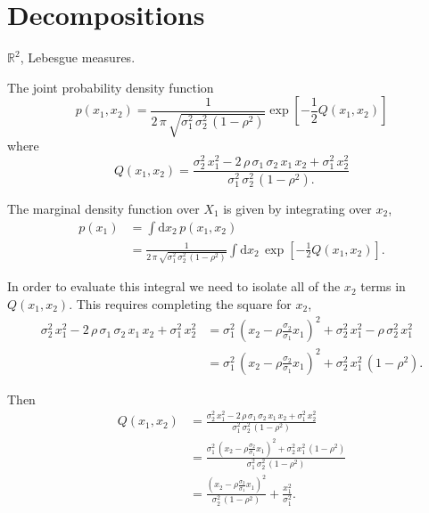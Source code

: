 \documentclass[11pt, oneside]{article}
\begin{document}
\section{Decompositions}

$\mathbb{R}^{2}$, Lebesgue measures.

The joint probability density function
%
\begin{equation*}
p( x_{1}, x_{2} )
=
\frac{1}{ 2 \, \pi \, \sqrt{ \sigma_{1}^{2} \, \sigma_{2}^{2} \, (1 - \rho^{2} ) } }
\exp \left[
  -\frac{1}{2} Q( x_{1}, x_{2} )
\right]
\end{equation*}
%
where
%
\begin{equation*}
Q ( x_{1}, x_{2} )
=
\frac{ 
    \sigma_{2}^{2} \, x_{1}^{2} 
  - 2 \, \rho \, \sigma_{1} \, \sigma_{2} \, x_{1} \, x_{2}
  + \sigma_{1}^{2} \, x_{2}^{2}
}{
  \sigma_{1}^{2} \, \sigma_{2}^{2} \, (1 - \rho^{2} ).
}
\end{equation*}

The marginal density function over $X_{1}$ is given by integrating over $x_{2}$,
%
\begin{align*}
p ( x_{1} ) 
&=
\int \mathrm{d} x_{2} \, 
p( x_{1}, x_{2} )
\\
&=
\frac{1}{ 2 \, \pi \, \sqrt{ \sigma_{1}^{2} \, \sigma_{2}^{2} \, (1 - \rho^{2} ) } }
\int \mathrm{d} x_{2} \, 
\exp \left[
  -\frac{1}{2} Q( x_{1}, x_{2} )
\right].
\end{align*}

In order to evaluate this integral we need to isolate all of the $x_{2}$ terms 
in $Q ( x_{1}, x_{2} )$.  This requires completing the square for $x_{2}$,
%
\begin{align*}
\sigma_{2}^{2} \, x_{1}^{2} 
  - 2 \, \rho \, \sigma_{1} \, \sigma_{2} \, x_{1} \, x_{2}
  + \sigma_{1}^{2} \, x_{2}^{2}
&=
\sigma_{1}^{2} \,
\left(
  x_{2} - \rho \frac{ \sigma_{2} }{ \sigma_{1} } x_{1}
\right)^{2}
+ 
\sigma_{2}^{2} \, x_{1}^{2}
- \rho \, \sigma_{2}^{2} \, x_{1}^{2} 
\\
&=
\sigma_{1}^{2} \,
\left(
  x_{2} - \rho \frac{ \sigma_{2} }{ \sigma_{1} } x_{1}
\right)^{2}
+ 
\sigma_{2}^{2} \, x_{1}^{2} \, (1 - \rho^{2} ).
\end{align*}

Then
%
\begin{align*}
Q ( x_{1}, x_{2} )
&=
\frac{ 
    \sigma_{2}^{2} \, x_{1}^{2} 
  - 2 \, \rho \, \sigma_{1} \, \sigma_{2} \, x_{1} \, x_{2}
  + \sigma_{1}^{2} \, x_{2}^{2}
}{
  \sigma_{1}^{2} \, \sigma_{2}^{2} \, (1 - \rho^{2} )
}
\\
&=
\frac{ 
  \sigma_{1}^{2} \,
  \left(
    x_{2} - \rho \frac{ \sigma_{2} }{ \sigma_{1} } x_{1}
  \right)^{2}
  +   
  \sigma_{2}^{2} \, x_{1}^{2} \, (1 - \rho^{2} )
}{
  \sigma_{1}^{2} \, \sigma_{2}^{2} \, (1 - \rho^{2} )
}
\\
&=
\frac{ 
  \left(
    x_{2} - \rho \frac{ \sigma_{2} }{ \sigma_{1} } x_{1}
  \right)^{2}
}{
  \sigma_{2}^{2} \, (1 - \rho^{2} )
}
+
\frac{  x_{1}^{2} }{ \sigma_{1}^{2} }.
\end{align*}
\end{document}
